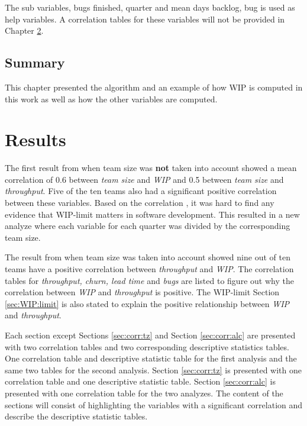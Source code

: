 \documentclass[UKenglish]{ifimaster}  %
\begin{document}
The sub variables, bugs finished, quarter and mean days backlog, bug is used as help variables. A correlation tables for these variables will not be provided in Chapter \ref{ch:res}. 

\section{Summary}
This chapter presented the algorithm and an example of how WIP is computed in this work as well as how the other variables are computed.


\chapter{Results}                     
\label{ch:res}
The first result from when team size was \textbf{not} taken into account showed a mean correlation  of 0.6 between \textit{team size} and \textit{WIP} and 0.5 between \textit{team size} and \textit{throughput}. Five of the ten teams also had a significant positive correlation between these variables. Based on the correlation , it was hard to find any evidence that WIP-limit matters in software development. This resulted in a new analyze where each variable for each quarter was divided by the corresponding team size.

The result from when team size was taken into account showed nine out of ten teams have a positive correlation between \textit{throughput} and \textit{WIP}. The correlation tables for \textit{throughput, churn, lead time} and \textit{bugs} are listed to figure out why the correlation between \textit{WIP} and \textit{throughput} is positive. The WIP-limit Section \ref{sec:WIP:limit} is also stated to explain the positive relationship between \textit{WIP} and \textit{throughput}.  

Each section except Sections \ref{sec:corr:tz}  and Section \ref{sec:corr:alc} are presented with two correlation tables and two corresponding descriptive statistics tables. One correlation table and descriptive statistic table for the first analysis and the same two tables for the second analysis. Section \ref{sec:corr:tz} is presented with one correlation table and one descriptive statistic table. Section \ref{sec:corr:alc} is presented  with one correlation table for the two analyzes. The content of the sections will consist of highlighting the variables with a significant correlation and describe the descriptive statistic tables.
\end{document}

